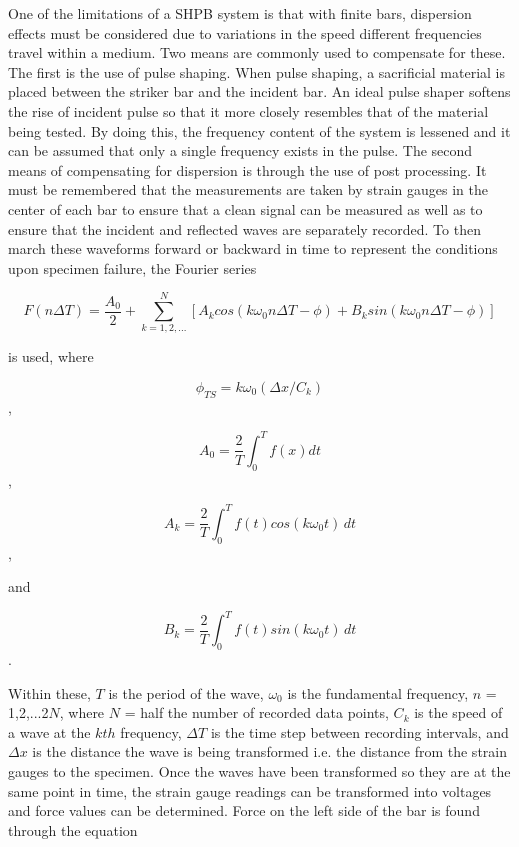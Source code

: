 \documentclass[12pt]{article}
\begin{document}
One of the limitations of a SHPB system is that with finite bars, dispersion effects must be considered due to variations in the speed different frequencies travel within a medium. Two means are commonly used to compensate for these. The first is the use of pulse shaping. When pulse shaping, a sacrificial material is placed between the striker bar and the incident bar. An ideal pulse shaper softens the rise of incident pulse so that it more closely resembles that of the material being tested. By doing this, the frequency content of the system is lessened and it can be assumed that only a single frequency exists in the pulse. The second means of compensating for dispersion is through the use of post processing. It must be remembered that the measurements are taken by strain gauges in the center of each bar to ensure that a clean signal can be measured as well as to ensure that the incident and reflected waves are separately recorded. To then march these waveforms forward or backward in time to represent the conditions upon specimen failure, the Fourier series

\begin{equation}
F(n\Delta T) = \frac{A_0}{2} + \sum\limits_{k=1,2,...}^N [A_k cos(k \omega_0 n \Delta T - \phi) + B_k sin(k\omega_0 n\Delta T - \phi)]
\end{equation}

is used, where 

\begin{equation}
\phi_{TS} = k\omega_0(\Delta x/C_k)
\end{equation} ,

\begin{equation}
A_0 = \frac{2}{T} \int_0^T \! f(x) dt
\end{equation} ,

\begin{equation}
A_k = \frac{2}{T} \int_0^T \! f(t)cos(k\omega_0t) \, dt
\end{equation} ,

and

\begin{equation}
B_k = \frac{2}{T} \int_0^T \! f(t)sin(k\omega_0t) \, dt
\end{equation} .

Within these, $T$ is the period of the wave, $\omega_0$ is the fundamental frequency, $n$ = 1,2,...2$N$, where $N$ = half the number of recorded data points, $C_k$ is the speed of a wave at the $kth$ frequency, $\Delta T$ is the time step between recording intervals, and $\Delta x$ is the distance the wave is being transformed i.e. the distance from the strain gauges to the specimen. Once the waves have been transformed so they are at the same point in time, the strain gauge readings can be transformed into voltages and force values can be determined. Force on the left side of the bar is found through the equation 
\end{document}
